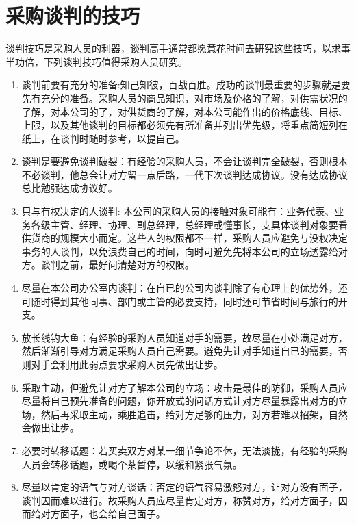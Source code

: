 \section {采购谈判的技巧}

    谈判技巧是采购人员的利器，谈判高手通常都愿意花时间去研究这些技巧，以求事半功倍，下列谈判技巧值得采购人员研究。

    \begin{enumerate}

        \item 谈判前要有充分的准备:知己知彼，百战百胜。成功的谈判最重要的步骤就是要先有充分的准备。采购人员的商品知识，对市场及价格的了解，对供需状况的了解，对本公司的了，对供货商的了解，对本公司能作出的价格底线、目标、上限，以及其他谈判的目标都必须先有所准备并列出优先级，将重点简短列在纸上，在谈判时随时参考，以提自己。

        \item 谈判是要避免谈判破裂：有经验的采购人员，不会让谈判完全破裂，否则根本不必谈判，他总会让对方留一点后路，一代下次谈判达成协议。没有达成协议总比勉强达成协议好。

        \item 只与有权决定的人谈判: 本公司的采购人员的接触对象可能有：业务代表、业务各级主管、经理、协理、副总经理，总经理或懂事长，支具体谈判对象要看供货商的规模大小而定。这些人的权限都不一样，采购人员应避免与没权决定事务的人谈判，以免浪费自己的时间，向时可避免先将本公司的立场透露绐对方。谈判之前，最好问清楚对方的权限。

        \item 尽量在本公司办公室内谈判：在自已的公司内谈判除了有心理上的优势外，还可随时得到其他同事、部门或主管的必要支持，同时还可节省时间与旅行的开支。

        \item 放长线钓大鱼：有经验的采购人员知道对手的需要，故尽量在小处满足对方，然后渐渐引导对方满足采购人员自己需要。避免先让对手知道自已的需要，否则对手会利用此弱点要求采购人员先做出让步。

        \item 采取主动，但避免让对方了解本公司的立场：攻击是最佳的防御，采购人员应尽量将自己预先准备的问题，你开放式的问话方式让对方尽量暴露出对方的立场，然后再采取主动，乘胜追击，给对方足够的压力，对方若难以招架，自然会做出让步。

        \item 必要时转移话题：若买卖双方对某一细节争论不休，无法淡拢，有经验的采购人员会转移话题，或喝个茶暂停，以缓和紧张气氛。

        \item 尽量以肯定的语气与对方谈话：否定的语气容易激怒对方，让对方没有面子，谈判因而难以进行。故采购人员应尽量肯定对方，称赞对方，给对方面子，因而给对方面子，也会给自己面子。


\end{enumerate}

